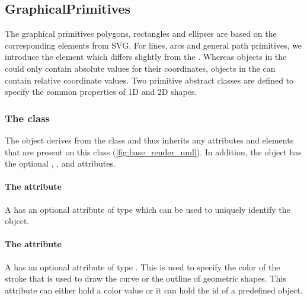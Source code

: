 \subsection{GraphicalPrimitives}

The graphical primitives polygons, rectangles and ellipses are based on the 
corresponding elements from SVG. For lines, arcs and general path primitives, we 
introduce the \RenderCurve element which differs slightly from the \LayoutPackage {}. 
Whereas  objects in the \LayoutPackage could only contain 
absolute values for their coordinates, \RenderPoint objects in the \RenderPackage 
can contain relative coordinate values.  Two primitive abstract classes are defined to specify the common properties of 1D and 2D shapes.


\subsubsection{The  class}
\label{graphicalprimitiveoned-class}

The \GraphicalPrimitiveOneD object derives from the \TransformationTwoD
class and thus inherits any attributes and elements that are present on
this class (\ref{fig:base_render_uml}).
In addition, the \GraphicalPrimitiveOneD object has the optional , ,  and  attributes.

\paragraph{The \fixttspace{} attribute}

A \GraphicalPrimitiveOneD has an optional attribute  of type
 which can be used to uniquely identify the object.

\paragraph{The \fixttspace{} attribute}

A \GraphicalPrimitiveOneD has an optional attribute  of
type . This is used to specify the color of the stroke that is used to draw the curve 
or the outline of geometric shapes. This 
attribute can either hold a color value or it can hold the id of a predefined
\ColorDefinition object.

